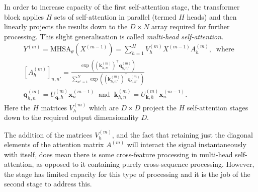 \documentclass{article}
\begin{document}
In order to increase capacity of the first self-attention stage, the transformer block applies $H$ sets of self-attention in parallel (termed $H$ heads) and then linearly projects the results down to the $D \times N$ array required for further processing. This slight generalisation is called \emph{multi-head self-attention}. 
%
\begin{align}
Y^{(m)} = \text{MHSA}_{\theta}(X^{(m-1)}) = \sum_{h=1}^H V^{(m)}_h X^{(m-1)} A_h^{(m)}, \label{eq:MHSA}\;\;\text{where} \;\;\\
%
%
%
[A^{(m)}_{h}]_{n,n'} = \frac{\exp\left( \left(\bm{k}_{h,n}^{(m)}\right)^\top  \bm{q}_{h,n'}^{(m)} \right)}{\sum_{n''=1}^N \exp \left( \left(\bm{k}_{h,n''}^{(m)}\right)^\top   \bm{q}_{h,n'}^{(m)} \right)} \\ \bm{q}_{h,n}^{(m)} = U^{(m)}_{\bm{q},h} \bm{x}^{(m-1)}_{n} \;\; \text{and} \;\;\bm{k}_{h,n}^{(m)} = U^{(m)}_{\bm{k},h} \bm{x}^{(m-1)}_{n}.
\end{align}
%
Here the $H$ matrices $V^{(m)}_h$ which are $D \times D$ project the $H$ self-attention stages down to the required output dimensionality $D$. 

The addition of the matrices $V^{(m)}_h$, and the fact that retaining just the diagonal elements of the attention matrix $A^{(m)}$ will interact the signal instantaneously with itself, does mean there is some cross-feature processing in multi-head self-attention, as opposed to it containing purely cross-sequence processing. However, the stage has limited capacity for this type of processing and it is the job of the second stage to address this. 
\end{document}
